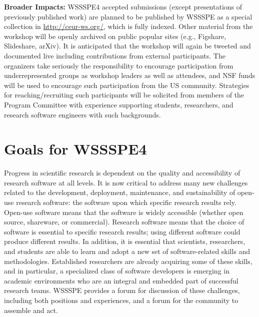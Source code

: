 \documentclass[11pt]{article}
\begin{document}
\noindent \textbf{Broader Impacts:} WSSSPE4 accepted submissions (except presentations of previously published work) are planned to be published by WSSSPE as a special collection in \url{http://ceur-ws.org/}, which is fully indexed.
Other material from the workshop will be openly archived on public popular sites (e.g., Figshare, Slideshare, arXiv). It is anticipated that the workshop will again be tweeted and documented live including contributions from external participants. The organizers take seriously the responsibility to encourage participation from underrepresented groups as workshop leaders as well as attendees, and NSF funds will be used to encourage such participation from the US community. 
Strategies for reaching\slash recruiting such participants will be solicited from members of the Program Committee with experience supporting students, researchers, and research software engineers with such backgrounds.


\newpage

\section{Goals for WSSSPE4}

Progress in scientific research is dependent on the quality and accessibility of research software at all levels. It is now critical to address many new challenges related to the development, deployment, maintenance, and sustainability of open-use research software: the software upon which specific research results rely.  Open-use software means that the software is widely accessible (whether open source, shareware, or commercial).  Research software means that the choice of software is essential to specific research results; using different software could produce different results.
In addition, it is essential that scientists, researchers, and students are able to learn and adopt a new set of software-related skills and methodologies. Established researchers are already acquiring some of these skills, and in particular, a specialized class of software developers is emerging in academic environments who are an integral and embedded part of successful research teams. WSSSPE provides a forum for discussion of these challenges, including both positions and experiences, and a forum for the community to assemble and act.
\end{document}
